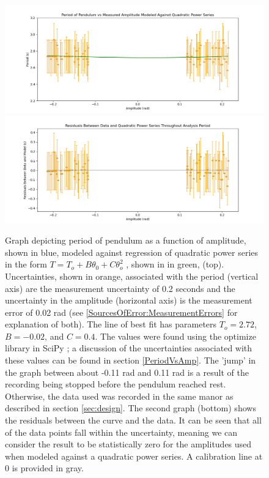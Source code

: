 \documentclass[11pt]{article}
\begin{document}
        \begin{figure}[H]
            \centering\includegraphics[width = \textwidth]{QuadraticPowerSeriesData.png}
            \centering\includegraphics[width = \textwidth]{QuadraticPowerSeriesResiduals.PNG}
            \caption{Graph depicting period of pendulum as a function of amplitude, shown in blue, modeled against regression of quadratic power series in the form $T = T_{o} + B\theta_{0} + C\theta_{o}^{2}$ \cite{labManual}, shown in in green, (top). Uncertainties, shown in orange, associated with the period (vertical axis) are the measurement uncertainty of 0.2 seconds and the uncertainty in the amplitude (horizontal axis) is the measurement error of 0.02 rad (see \ref{SourcesOfError:MeasurementErrors} for explanation of both). The line of best fit has parameters $T_o = 2.72$, $B = -0.02 $, and $C = 0.4$. The values were found using the optimize library in SciPy \cite{2020SciPy-NMeth}; a discussion of the uncertainties associated with these values can be found in section \ref{PeriodVsAmp}. The 'jump' in the graph between about -0.11 rad and 0.11 rad is a result of the recording being stopped before the pendulum reached rest. Otherwise, the data used was recorded in the same manor as described in section \ref{sec:design}. The second graph (bottom) shows the residuals between the curve and the data. It can be seen that all of the data points fall within the uncertainty, meaning we can consider the result to be statistically zero for the amplitudes used when modeled against a quadratic power series. A calibration line at 0 is provided in gray.}  
            \label{fig:QuadraticPowerSeries}        
        \end{figure}
\end{document}
